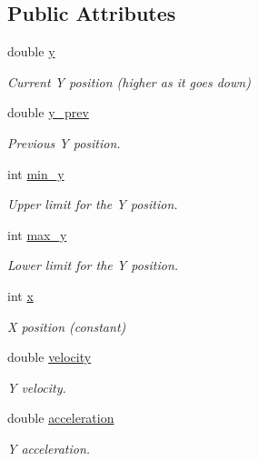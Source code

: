 \subsection*{Public Attributes}
\begin{DoxyCompactItemize}
\item 
double \mbox{\hyperlink{group__flappy_ga15a7c5b25ca78cfeb5602ccbcdc3c791}{y}}
\begin{DoxyCompactList}\small\item\em Current Y position (higher as it goes down) \end{DoxyCompactList}\item 
double \mbox{\hyperlink{group__flappy_gaf76198a3e19591093eac03361d16f009}{y\+\_\+prev}}
\begin{DoxyCompactList}\small\item\em Previous Y position. \end{DoxyCompactList}\item 
int \mbox{\hyperlink{group__flappy_gaf9332ac0c4adb80502608cdfa72ff81b}{min\+\_\+y}}
\begin{DoxyCompactList}\small\item\em Upper limit for the Y position. \end{DoxyCompactList}\item 
int \mbox{\hyperlink{group__flappy_ga4f989e709d0c300ac4fdd9e29a8d3307}{max\+\_\+y}}
\begin{DoxyCompactList}\small\item\em Lower limit for the Y position. \end{DoxyCompactList}\item 
int \mbox{\hyperlink{group__flappy_gae4657ec5b3f2a736b7a17951590e5bea}{x}}
\begin{DoxyCompactList}\small\item\em X position (constant) \end{DoxyCompactList}\item 
double \mbox{\hyperlink{group__flappy_gac9e51902eab494c5688633c5c56b5a1a}{velocity}}
\begin{DoxyCompactList}\small\item\em Y velocity. \end{DoxyCompactList}\item 
double \mbox{\hyperlink{group__flappy_gaacd6cd48cfa7bd2824488c23fa64396c}{acceleration}}
\begin{DoxyCompactList}\small\item\em Y acceleration. \end{DoxyCompactList}\item 

\end{DoxyCompactItemize}
